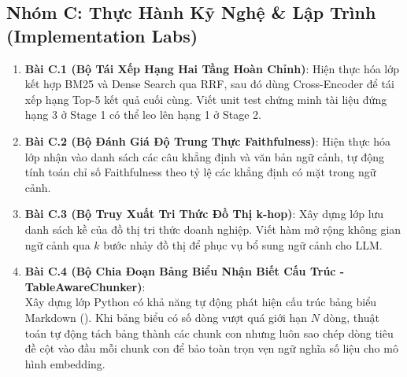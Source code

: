 \subsection{Nhóm C: Thực Hành Kỹ Nghệ \& Lập Trình (Implementation Labs)}
\begin{enumerate}
  \item \textbf{Bài C.1 (Bộ Tái Xếp Hạng Hai Tầng Hoàn Chỉnh)}:
  Hiện thực hóa lớp  kết hợp BM25 và Dense Search qua RRF, sau đó dùng Cross-Encoder để tái xếp hạng Top-5 kết quả cuối cùng. Viết unit test chứng minh tài liệu đứng hạng 3 ở Stage 1 có thể leo lên hạng 1 ở Stage 2.

  \item \textbf{Bài C.2 (Bộ Đánh Giá Độ Trung Thực Faithfulness)}:
  Hiện thực hóa lớp  nhận vào danh sách các câu khẳng định và văn bản ngữ cảnh, tự động tính toán chỉ số Faithfulness theo tỷ lệ các khẳng định có mặt trong ngữ cảnh.

  \item \textbf{Bài C.3 (Bộ Truy Xuất Tri Thức Đồ Thị k-hop)}:
  Xây dựng lớp  lưu danh sách kề của đồ thị tri thức doanh nghiệp. Viết hàm  mở rộng không gian ngữ cảnh qua $k$ bước nhảy đồ thị để phục vụ bổ sung ngữ cảnh cho LLM.

  \item \textbf{Bài C.4 (Bộ Chia Đoạn Bảng Biểu Nhận Biết Cấu Trúc - TableAwareChunker)}: \\
  Xây dựng lớp Python  có khả năng tự động phát hiện cấu trúc bảng biểu Markdown (). Khi bảng biểu có số dòng vượt quá giới hạn $N$ dòng, thuật toán tự động tách bảng thành các chunk con nhưng luôn sao chép dòng tiêu đề cột vào đầu mỗi chunk con để bảo toàn trọn vẹn ngữ nghĩa số liệu cho mô hình embedding.
\end{enumerate}

